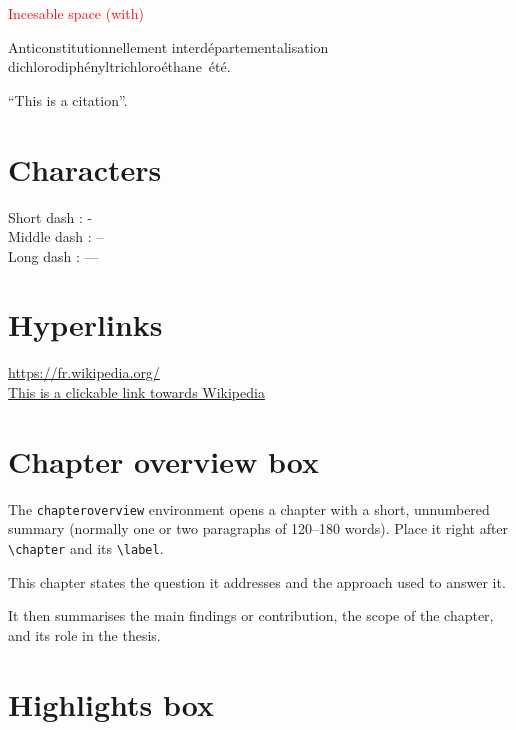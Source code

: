 \medbreak

\textcolor{red}{Incesable space (with)}

Anticonstitutionnellement interdépartementalisation dichlorodiphényltrichloroéthane~été.

\newpage

``This is a citation''.

\newpage


\section{Characters}
Short dash : - \\
Middle dash : -- \\
Long dash : --- \\

\newpage


\section{Hyperlinks}
\url{https://fr.wikipedia.org/} \\
\href{https://fr.wikipedia.org/}{This is a clickable link towards Wikipedia}

\newpage



\section{Chapter overview box}

The \texttt{chapteroverview} environment opens a chapter with a short, unnumbered summary (normally one or two paragraphs of 120--180 words). Place it right after \verb|\chapter| and its \verb|\label|.

\begin{chapteroverview}
This chapter states the question it addresses and the approach used to answer it.

It then summarises the main findings or contribution, the scope of the chapter, and its role in the thesis.
\end{chapteroverview}

\section{Highlights box}

